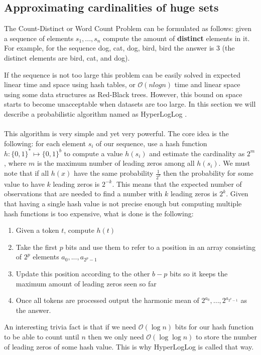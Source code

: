 \subsection{Approximating cardinalities of huge sets}
\label{subsec:wcountproblem}
The Count-Distinct or Word Count Problem can be formulated as follows: given a sequence of elements $s_{1}, ..., s_{n}$ compute the amount of \textbf{distinct} elements in it. For example, for the sequence dog, cat, dog, bird, bird the answer is 3 (the distinct elements are bird, cat, and dog).

If the sequence is not too large this problem can be easily solved in expected linear time and space using hash tables, or $\mathcal{O}(nlogn)$ time and linear space using some data structures as Red-Black trees. However, this bound on space starts to become unacceptable when datasets are too large. In this section we will describe a probabilistic algorithm named as HyperLogLog \cite{Flajolet07hyperloglog:the}.\\
\\
This algorithm is very simple and yet very powerful. The core idea is the following: for each element $s_{i}$ of our sequence, use a hash function $h: \{0, 1\}^{*} \mapsto \{0, 1\}^b$ to compute a value $h(s_{i})$ and estimate the cardinality as $2^m$, where $m$ is the maximum number of leading zeros among all $h(s_{i})$. We must note that if all $h(x)$ have the same probability $\frac{1}{2^{b}}$ then the probability for some value to have $k$ leading zeros is $2^{-k}$. This means that the expected number of observations that are needed to find a number with $k$ leading zeros is $2^{k}$. Given that having a single hash value is not precise enough but computing multiple hash functions is too expensive, what is done is the following: 
\begin{enumerate}
\item Given a token $t$, compute $h(t)$
\item Take the first $p$ bits and use them to refer to a position in an array consisting of $2^p$ elements $a_{0}, ..., a_{2^p - 1}$
\item Update this position according to the other $b - p$ bits so it keeps the maximum amount of leading zeros seen so far
\item Once all tokens are processed output the harmonic mean of $2^{a_{0}}, ..., 2^{a_{2^p - 1}}$ as the answer.
\end{enumerate}
An interesting trivia fact is that if we need $\mathcal{O}(\log n)$ bits for our hash function to be able to count until $n$ then we only need $\mathcal{O}(\log \log n)$ to store the number of leading zeros of some hash value. This is why HyperLogLog is called that way.\\
